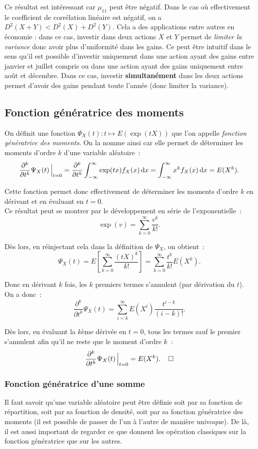 \documentclass{article}
\begin{document}
			Ce résultat est intéressant car $\mu_{11}$ peut être négatif. Dans le cas où effectivement le coefficient de corrélation linéaire est négatif, on a
			$D^2(X+Y) < D^2(X)+D^2(Y)$. Cela a des applications entre autres en économie : dans ce cas, investir dans deux actions $X$ et $Y$ permet de
			\textit{limiter la variance} donc avoir plus d'uniformité dans les gains. Ce peut être intuitif dans le sens qu'il est possible d'investir uniquement dans
			une action ayant des gains entre janvier et juillet compris ou dans une action ayant des gains uniquement entre août et décembre. Dans ce cas, investir
			\textbf{simultanément} dans les deux actions permet d'avoir des gains pendant toute l'année (donc limiter la variance).

	\subsection{Fonction génératrice des moments}
		On définit une fonction $\Psi_X(t) : t \mapsto E(\exp(tX))$ que l'on appelle \textit{fonction génératrice des moments}. On la nomme ainsi car elle permet de
		déterminer les moments d'ordre $k$ d'une variable aléatoire~:
		\[\frac {\partial^k}{\partial t^k}\Psi_X(t)\sVert[2] _{t=0} = \frac {\partial^k}{\partial t^k}\int_{-\infty}^\infty\exp(tx)f_X(x)\dif x
			= \int_{-\infty}^\infty x^kf_X(x)\dif x = E(X^k).\]

		Cette fonction permet donc effectivement de déterminer les moments d'ordre $k$ en dérivant et en évaluant en $t = 0$. \\
		Ce résultat peut se montrer par le développement en série de l'exponentielle~:
		\[\exp(v) = \sum_{k=0}^\infty\frac {v^k}{k!}.\]

		Dès lors, en réinjectant cela dans la définition de $\Psi_X$, on obtient~:
		\[\Psi_X(t) = E\left[\sum_{k=0}^\infty\frac {(tX)^k}{k!}\right] = \sum_{k=0}^\infty\frac {t^k}{k!}E(X^k).\]

		Donc en dérivant $k$ fois, les $k$ premiers termes s'annulent (par dérivation du $t$). On a donc~:
		\[\frac {\partial^k}{\partial t^k}\Psi_X(t) = \sum_{i=k}^\infty E(X^i)\frac {t^{i-k}}{(i-k)!}.\]

		Dès lors, en évaluant la $k$ème dérivée en $t = 0$, tous les termes sauf le premier s'annulent afin qu'il ne reste que le moment d'ordre $k$~:
		\[\frac {\partial^k}{\partial t^k}\Psi_X(t)\sVert[2]_{t=0} = E(X^k).\;\;\;\;\square\]

		\subsubsection{Fonction génératrice d'une somme}
			Il faut savoir qu'une variable aléatoire peut être définie soit par sa fonction de répartition, soit par sa fonction de densité, soit par sa fonction
			génératrice des moments (il est possible de passer de l'un à l'autre de manière univoque). De là, il est aussi important de regarder ce que donnent les
			opération classiques sur la fonction génératrice que sur les autres.
\end{document}
